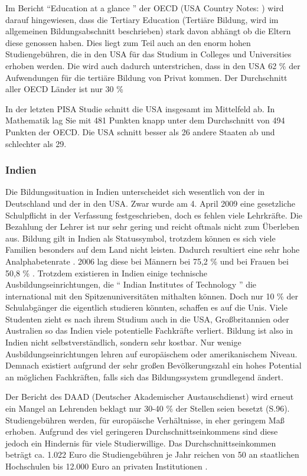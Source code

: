Im Bericht ``Education at a glance '' der OECD (USA Country Notes: \cite{oecd4}) wird darauf hingewiesen, dass die Tertiary Education (Tertiäre Bildung, wird im allgemeinen Bildungsabschnitt beschrieben) stark davon abhängt ob die Eltern diese genossen haben. Dies liegt zum Teil auch an den enorm hohen Studiengebühren, die in den USA für das Studium in Colleges und Universities erhoben werden. Die wird auch dadurch unterstrichen, dass in den USA 62 \% der Aufwendungen für die tertiäre Bildung von Privat kommen. Der Durchschnitt aller OECD Länder ist nur 30 \%

In der letzten PISA Studie schnitt die USA insgesamt im Mittelfeld ab. In Mathematik lag Sie mit 481 Punkten knapp unter dem Durchschnitt von 494 Punkten der OECD. Die USA schnitt besser als 26 andere Staaten ab und schlechter als 29. \cite{pisa2}

\subsubsection*{Indien}

Die Bildungssituation in Indien unterscheidet sich wesentlich von der in Deutschland und der in den USA. Zwar wurde am 4. April 2009 eine gesetzliche Schulpflicht in der Verfassung festgeschrieben, doch es fehlen viele Lehrkräfte. \cite{dw} Die Bezahlung der Lehrer ist nur sehr gering und reicht oftmals nicht zum Überleben aus. Bildung gilt in Indien als Statussymbol, trotzdem können es sich viele Familien besonders auf dem Land nicht leisten. Dadurch resultiert eine sehr hohe Analphabetenrate \cite{analpha}. 2006 lag diese bei Männern bei 75,2 \% und bei Frauen bei 50,8 \% .
Trotzdem existieren in Indien einige technische Ausbildungseinrichtungen, die `` Indian Institutes of Technology '' die international mit den Spitzenuniversitäten mithalten können. Doch nur 10 \% der Schulabgänger die eigentlich studieren könnten, schaffen es auf die Unis. Viele Studenten zieht es nach ihrem Studium auch in die USA, Großbritannien oder Australien so das Indien viele potentielle Fachkräfte verliert.
Bildung ist also in Indien nicht selbstverständlich, sondern sehr kostbar. Nur wenige Ausbildungseinrichtungen lehren auf europäischem oder amerikanischem Niveau. Demnach existiert aufgrund der sehr großen Bevölkerungszahl ein hohes Potential an möglichen Fachkräften, falls sich das Bildungssystem grundlegend ändert.

Der Bericht des DAAD (Deutscher Akademischer Austauschdienst) \cite{daad} wird erneut ein Mangel an Lehrenden beklagt nur 30-40 \% der Stellen seien besetzt (S.96).
Studiengebühren werden, für europäische Verhältnisse, in eher geringem Maß erhoben. Aufgrund des viel geringeren Durchschnittseinkommens sind diese jedoch ein Hindernis für viele Studierwillige. Das Durchschnittseinkommen beträgt ca. 1.022 Euro \cite{ausa} die Studiengebühren je Jahr reichen von 50 an staatlichen Hochschulen bis 12.000 Euro an privaten Institutionen \cite[101]{daad}.


